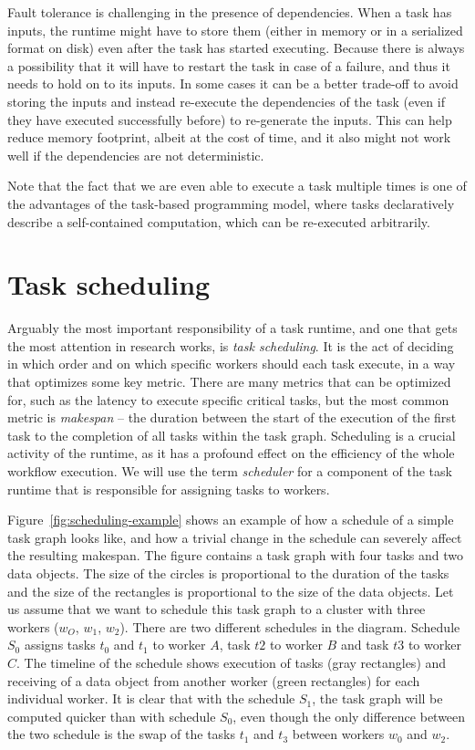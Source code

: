 Fault tolerance is challenging in the presence of dependencies. When a task has inputs, the runtime
might have to store them (either in memory or in a serialized format on disk) even after the task
has started executing. Because there is always a possibility that it will have to restart the task
in case of a failure, and thus it needs to hold on to its inputs. In some cases it can be a better
trade-off to avoid storing the inputs and instead re-execute the dependencies of the task (even if
they have executed successfully before) to re-generate the inputs. This can help reduce memory
footprint, albeit at the cost of time, and it also might not work well if the dependencies are not
deterministic.

Note that the fact that we are even able to execute a task multiple times is one of the advantages
of the task-based programming model, where tasks declaratively describe a self-contained
computation, which can be re-executed arbitrarily.


\section{Task scheduling}
Arguably the most important responsibility of a task runtime, and one that gets the most attention
in research works, is \emph{task scheduling}. It is the act of deciding in which order and on which
specific workers should each task execute, in a way that optimizes some key metric. There are many
metrics that can be optimized for, such as the latency to execute specific critical tasks, but the
most common metric is \emph{makespan} -- the duration between the start of the execution of
the first task to the completion of all tasks within the task graph. Scheduling is a crucial
activity of the runtime, as it has a profound effect on the efficiency of the whole workflow
execution. We will use the term \emph{scheduler} for a component of the task runtime that is
responsible for assigning tasks to workers.

Figure~\ref{fig:scheduling-example} shows an example of how a schedule of a simple task graph looks like,
and how a trivial change in the schedule can severely affect the resulting makespan. The figure
contains a task graph with four tasks and two data objects. The size of the circles is proportional
to the duration of the tasks and the size of the rectangles is proportional to the size of the data
objects. Let us assume that we want to schedule this task graph to a cluster with three workers
($w_O$, $w_1$, $w_2$). There are two different
schedules in the diagram. Schedule $S_0$ assigns tasks $t_0$ and
$t_1$ to worker $A$, task $t2$ to worker
$B$ and task $t3$ to worker $C$. The
timeline of the schedule shows execution of tasks (gray rectangles) and receiving of a data object
from another worker (green rectangles) for each individual worker. It is clear that with the
schedule $S_1$, the task graph will be computed quicker than with schedule
$S_0$, even though the only difference between the two schedule is the swap of the
tasks $t_1$ and $t_3$ between workers $w_0$ and
$w_2$.

